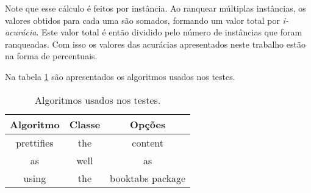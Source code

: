 Note que esse cálculo é feitos por instância. 
Ao ranquear múltiplas instâncias, os valores obtidos para cada uma são somados, formando um valor total por \textit{i-acurácia}.
Este valor total é então dividido pelo número de instâncias que foram ranqueadas.
Com isso os valores das acurácias apresentados neste trabalho estão na forma de percentuais.





Na tabela \ref{tab:algoritmostestes} são apresentados os algoritmos usados nos testes.

\begin{table}[h!]
  \begin{center}
    \caption{Algoritmos usados nos testes.}
    \label{tab:algoritmostestes}
    \begin{tabular}{ccc}
      \toprule
      Algoritmo & Classe & Opções\\
      \midrule
      prettifies & the & content\\
      as & well & as\\
      using & the & booktabs package\\
      \bottomrule
    \end{tabular}
  \end{center}
\end{table}




